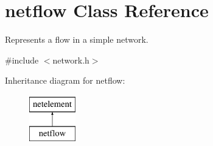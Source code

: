 \hypertarget{classnetflow}{\section{netflow Class Reference}
\label{classnetflow}
}


Represents a flow in a simple network.  




{\ttfamily \#include $<$network.\-h$>$}

Inheritance diagram for netflow\-:\begin{figure}[H]
\begin{center}
\leavevmode
\includegraphics[height=2.000000cm]{classnetflow}
\end{center}
\end{figure}
